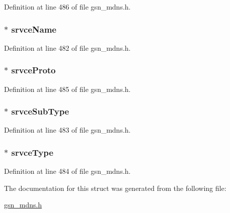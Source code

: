 Definition at line 486 of file gsn\_\-mdns.h.

\hypertarget{a00141_a04b7b35934b06d9d838a42dc302525c4}{
\subsubsection[{srvceName}]{$\ast$ {\bf srvceName}}}
\label{a00141_a04b7b35934b06d9d838a42dc302525c4}


Definition at line 482 of file gsn\_\-mdns.h.

\hypertarget{a00141_a9dd2986de2728362170d70c3a10d605c}{
\subsubsection[{srvceProto}]{$\ast$ {\bf srvceProto}}}
\label{a00141_a9dd2986de2728362170d70c3a10d605c}


Definition at line 485 of file gsn\_\-mdns.h.

\hypertarget{a00141_a1abfc1470aad0566d2bd0f9566dced35}{
\subsubsection[{srvceSubType}]{$\ast$ {\bf srvceSubType}}}
\label{a00141_a1abfc1470aad0566d2bd0f9566dced35}


Definition at line 483 of file gsn\_\-mdns.h.

\hypertarget{a00141_ae936821f0b28aba244cd7270eab50b96}{
\subsubsection[{srvceType}]{$\ast$ {\bf srvceType}}}
\label{a00141_ae936821f0b28aba244cd7270eab50b96}


Definition at line 484 of file gsn\_\-mdns.h.



The documentation for this struct was generated from the following file:\begin{DoxyCompactItemize}
\item 
\hyperlink{a00526}{gsn\_\-mdns.h}\end{DoxyCompactItemize}
